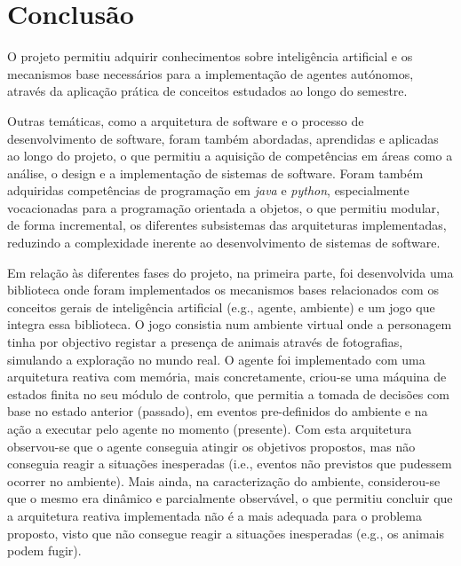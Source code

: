 \chapter{Conclusão}\label{ch:conclusao}

O projeto permitiu adquirir conhecimentos sobre inteligência artificial e os mecanismos base necessários para a implementação de agentes autónomos, através da aplicação prática de conceitos estudados ao longo do semestre.

Outras temáticas, como a arquitetura de software e o processo de desenvolvimento de software, foram também abordadas, aprendidas e aplicadas ao longo do projeto, o que permitiu a aquisição de competências em áreas como a análise, o design e a implementação de sistemas de software.
Foram também adquiridas competências de programação em \textit{java} e \textit{python}, especialmente vocacionadas para a programação orientada a objetos, o que permitiu modular, de forma incremental, os diferentes subsistemas das arquiteturas implementadas, reduzindo a complexidade inerente ao desenvolvimento de sistemas de software.

Em relação às diferentes fases do projeto, na primeira parte, foi desenvolvida uma biblioteca onde foram implementados os mecanismos bases relacionados com os conceitos gerais de inteligência artificial (e.g., agente, ambiente) e um jogo que integra essa biblioteca.
O jogo consistia num ambiente virtual onde a personagem tinha por objectivo registar a presença de animais através de fotografias, simulando a exploração no mundo real.
O agente foi implementado com uma arquitetura reativa com memória, mais concretamente, criou-se uma máquina de estados finita no seu módulo de controlo, que permitia a tomada de decisões com base no estado anterior (passado), em eventos pre-definidos do ambiente e na ação a executar pelo agente no momento (presente).
Com esta arquitetura observou-se que o agente conseguia atingir os objetivos propostos, mas não conseguia reagir a situações inesperadas (i.e., eventos não previstos que pudessem ocorrer no ambiente).
Mais ainda, na caracterização do ambiente, considerou-se que o mesmo era dinâmico e parcialmente observável, o que permitiu concluir que a arquitetura reativa implementada não é a mais adequada para o problema proposto, visto que não consegue reagir a situações inesperadas (e.g., os animais podem fugir).

